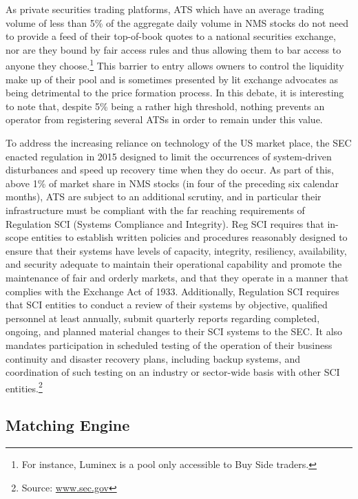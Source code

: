 As private securities trading platforms, ATS which have an average trading volume of less than 5\% of the aggregate daily volume in NMS stocks do not need to provide a feed of their top-of-book quotes to a national securities exchange, nor are they bound by fair access rules and thus allowing them to bar access to anyone they choose.\footnote{For instance, Luminex is a pool only accessible to Buy Side traders.} This barrier to entry allows owners to control the liquidity make up of their pool and is sometimes presented by lit exchange advocates as being detrimental to the price formation process. In this debate, it is interesting to note that, despite 5\% being a rather high threshold, nothing prevents an operator from registering several ATSs in order to remain under this value.


To address the increasing reliance on technology of the US market place, the SEC enacted regulation in 2015 designed to limit the occurrences of system-driven disturbances and speed up recovery time when they do occur. As part of this, above 1\% of market share in NMS stocks (in four of the preceding six calendar months), ATS are subject to an additional scrutiny, and in particular their infrastructure must be compliant with the far reaching requirements of Regulation SCI (Systems Compliance and Integrity). Reg SCI requires that in-scope entities to establish written policies and procedures reasonably designed to ensure that their systems have levels of capacity, integrity, resiliency, availability, and security adequate to maintain their operational capability and promote the maintenance of fair and orderly markets, and that they operate in a manner that complies with the Exchange Act of 1933. Additionally, Regulation SCI requires that SCI entities to conduct a review of their systems by objective, qualified personnel at least annually, submit quarterly reports regarding completed, ongoing, and planned material changes to their SCI systems to the SEC. It also mandates participation in scheduled testing of the operation of their business continuity and disaster recovery plans, including backup systems, and coordination of such testing on an industry or sector-wide basis with other SCI entities.\footnote{Source: \url{www.sec.gov}}



\subsection{Matching Engine\label{sec:match_engine}}\label{in:matcheng1}

